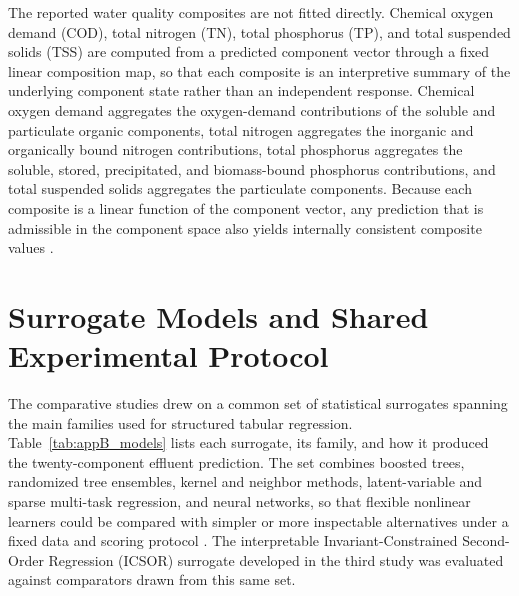 \documentclass[12pt, twoside]{book}
\begin{document}
The reported water quality composites are not fitted directly. Chemical oxygen demand (COD), total nitrogen
(TN), total phosphorus (TP), and total suspended solids (TSS) are computed from a predicted component vector
through a fixed linear composition map, so that each composite is an interpretive summary of the underlying
component state rather than an independent response. Chemical oxygen demand aggregates the oxygen-demand
contributions of the soluble and particulate organic components, total nitrogen aggregates the inorganic and
organically bound nitrogen contributions, total phosphorus aggregates the soluble, stored, precipitated, and
biomass-bound phosphorus contributions, and total suspended solids aggregates the particulate components.
Because each composite is a linear function of the component vector, any prediction that is admissible in the
component space also yields internally consistent composite values \citep{Henze2006}.


\chapter{Surrogate Models and Shared Experimental Protocol}
\label{ch:appendix.b}

The comparative studies drew on a common set of statistical surrogates spanning the main families used for
structured tabular regression. Table~\ref{tab:appB_models} lists each surrogate, its family, and how it
produced the twenty-component effluent prediction. The set combines boosted trees, randomized tree ensembles,
kernel and neighbor methods, latent-variable and sparse multi-task regression, and neural networks, so that
flexible nonlinear learners could be compared with simpler or more inspectable alternatives under a fixed data
and scoring protocol \citep{Breiman2001,ChenGuestrin2016,Wold2001,Hornik1989,ArikPfister2021,Borisov2024}. The
interpretable Invariant-Constrained Second-Order Regression (ICSOR) surrogate developed in the third study was
evaluated against comparators drawn from this same set.
\end{document}
